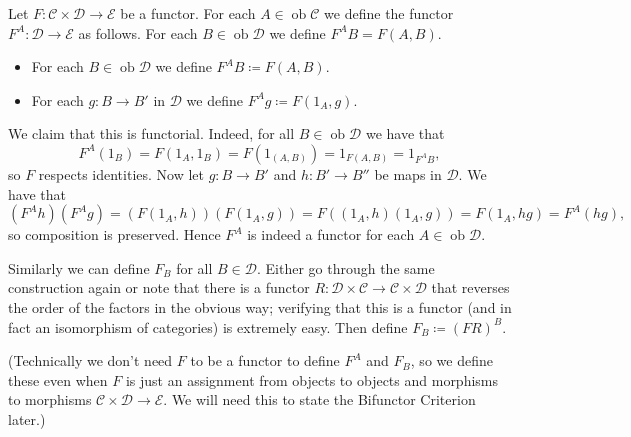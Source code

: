 \documentclass{report}
\DeclareMathOperator{\ob}{ob}
\theoremstyle{definition}
\theoremstyle{plain}
\theoremstyle{definition}
\begin{document}
	 Let $F\colon\mathcal{C}\times \mathcal{D}\to\mathcal{E}$ be a functor. For each $A\in\ob\mathcal{C}$ we define the functor $F^A \colon \mathcal{D}\to\mathcal{E}$ as follows. 
	 For each $B\in\ob\mathcal{D}$ we define $F^AB = F(A,B)$.
	 \begin{itemize}
	 	\item For each $B\in\ob\mathcal{D}$ we define $F^AB \coloneqq F(A,B)$.
	 	\item For each $g\colon B\to B'$ in $\mathcal{D}$ we define $F^Ag \coloneqq F(1_A,g)$.
	 \end{itemize}
	 We claim that this is functorial. Indeed, for all $B\in\ob\mathcal{D}$ we have that 
	 \[
	 	F^A(1_B) = F(1_A,1_B) = F(1_{(A,B)}) = 1_{F(A,B)} = 1_{F^AB},
	 \]
	 so $F$ respects identities. Now let $g\colon B \to B'$ and $h\colon B' \to B''$ be maps in $\mathcal{D}$. We have that
	 \[
	 	(F^Ah)(F^Ag) = (F(1_A,h))(F(1_A,g)) = F((1_A,h)(1_A,g)) = F(1_A,hg) = F^A(hg),
	 \]
	 so composition is preserved. Hence $F^A$ is indeed a functor for each $A\in\ob\mathcal{D}$. 
	 
	 Similarly we can define $F_B$ for all $B\in\mathcal{D}$. Either go through the same construction again or note that there is a functor $R\colon \mathcal{D}\times \mathcal{C}\to\mathcal{C}\times\mathcal{D}$ that reverses the order of the factors in the obvious way; verifying  that this is a functor (and in fact an isomorphism of categories) is extremely easy. Then define $F_B \coloneq (FR)^B$.
	 
	 (Technically we don't need $F$ to be a functor to define $F^A$ and $F_B$, so we define these even when $F$ is just an assignment from objects to objects and morphisms to morphisms $\mathcal{C}\times\mathcal{D}\to\mathcal{E}$. We will need this to state the Bifunctor Criterion later.)
	 
\end{document}

